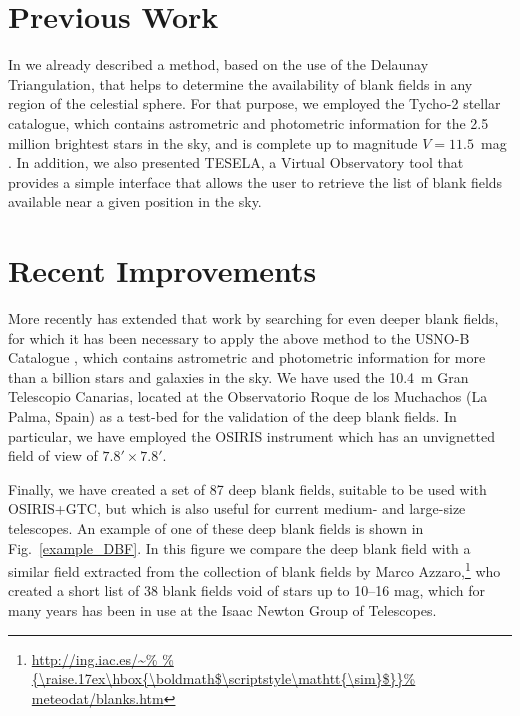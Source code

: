 \section{Previous Work}

In \citet[][hereafter paper~I]{2011MNRAS.417.3061C} \citep[see also
contribution in previous ADASS~XXI:][]{2012ASPC..461..173C} we already
described a method, based on the use of the Delaunay Triangulation, that helps
to determine the availability of blank fields in any region of the celestial
sphere. For that purpose, we employed the Tycho-2 stellar catalogue, which
contains astrometric and photometric information for the 2.5 million brightest
stars in the sky, and is complete up to magnitude $V=11.5$~mag
\citep{1997A&A...323L..49P}. In addition, we also presented TESELA, a Virtual
Observatory tool that provides a simple interface that allows the user to
retrieve the list of blank fields available near a given position in the sky.

\section{Recent Improvements}

More recently \citep[][hereafter paper~II]{2012arXiv1209.4861J} has
extended that work by searching for even deeper blank fields, for which it has
been necessary to apply the above method to the USNO-B Catalogue
\citep{2003AJ....125..984M}, which contains astrometric and photometric
information for more than a billion stars and galaxies in the sky. We have used
the 10.4~m Gran Telescopio Canarias, located at the Observatorio Roque de los
Muchachos (La Palma, Spain) as a test-bed for the validation of the deep blank
fields. In particular, we have employed the OSIRIS instrument
\citep{2000SPIE.4008..623C} which has an unvignetted field of view of $7.8'
\times 7.8'$. 

Finally, we have created a set of 87 deep blank fields, suitable
to be used with OSIRIS+GTC, but which is also useful for current medium- and
large-size telescopes. An example of one of these deep blank fields is shown in
Fig.~\ref{example_DBF}. In this figure we compare the deep blank field with a
similar field extracted from the collection of blank fields by Marco
Azzaro,\footnote{\url{http://ing.iac.es/~%
meteodat/blanks.htm}}
who created a short list of 38 blank fields void of stars up to 10--16 mag,
which for many years has been in use at the Isaac Newton Group of Telescopes.


